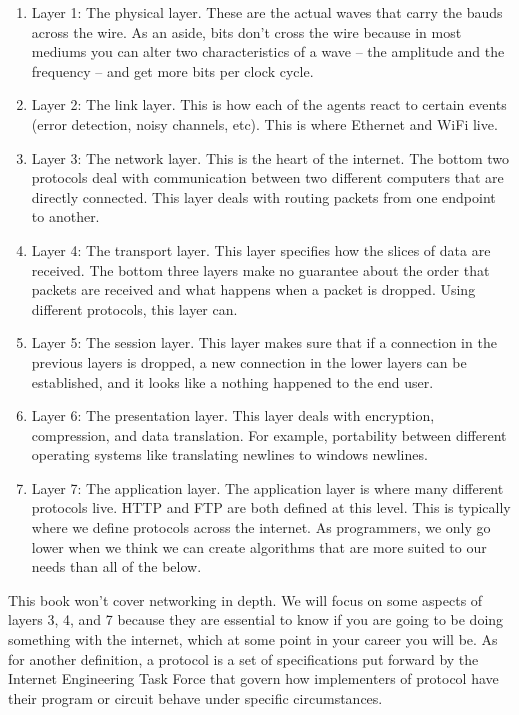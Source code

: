 \begin{enumerate}
\item Layer 1: The physical layer.
  These are the actual waves that carry the bauds across the wire.
  As an aside, bits don't cross the wire because in most mediums you can alter two characteristics of a wave -- the amplitude and the frequency -- and get more bits per clock cycle.

\item Layer 2: The link layer.
  This is how each of the agents react to certain events (error detection, noisy channels, etc).
  This is where \gls{Ethernet} and \gls{WiFi} live.

\item Layer 3: The network layer.
  This is the heart of the internet.
  The bottom two protocols deal with communication between two different computers that are directly connected.
  This layer deals with routing packets from one endpoint to another.

\item Layer 4: The transport layer.
  This layer specifies how the slices of data are received.
  The bottom three layers make no guarantee about the order that packets are received and what happens when a packet is dropped.
  Using different protocols, this layer can.

\item Layer 5: The session layer.
  This layer makes sure that if a connection in the previous layers is dropped, a new connection in the lower layers can be established, and it looks like a nothing happened to the end user.

\item Layer 6: The presentation layer.
  This layer deals with encryption, compression, and data translation.
  For example, portability between different operating systems like translating newlines to windows newlines.

\item Layer 7: The application layer.
  The application layer is where many different protocols live.
  \gls{HTTP} and \gls{FTP} are both defined at this level.
  This is typically where we define protocols across the internet.
  As programmers, we only go lower when we think we can create algorithms that are more suited to our needs than all of the below.

\end{enumerate}

This book won't cover networking in depth.
We will focus on some aspects of layers 3, 4, and 7 because they are essential to know if you are going to be doing something with the internet, which at some point in your career you will be.
As for another definition, a protocol is a set of specifications put forward by the \gls{Internet Engineering Task Force} that govern how implementers of protocol have their program or circuit behave under specific circumstances.


